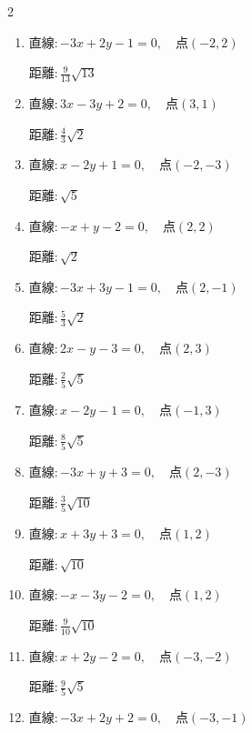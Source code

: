 \begin{multicols}{2}
\begin{enumerate}
        $\displaystyle 距離 : \frac{5}{13}\sqrt{13}$

  \item $直線:-3x+2y-1=0,\quad 点 ( -2, 2 )$

        $\displaystyle 距離 : \frac{9}{13}\sqrt{13}$

  \item $直線:3x-3y+2=0,\quad 点 ( 3, 1 )$

        $\displaystyle 距離 : \frac{4}{3}\sqrt{2}$

  \item $直線:x-2y+1=0,\quad 点 ( -2, -3 )$

        $\displaystyle 距離 : \sqrt{5}$

  \item $直線:-x+y-2=0,\quad 点 ( 2, 2 )$

        $\displaystyle 距離 : \sqrt{2}$

  \item $直線:-3x+3y-1=0,\quad 点 ( 2, -1 )$

        $\displaystyle 距離 : \frac{5}{3}\sqrt{2}$

  \item $直線:2x-y-3=0,\quad 点 ( 2, 3 )$

        $\displaystyle 距離 : \frac{2}{5}\sqrt{5}$

  \item $直線:x-2y-1=0,\quad 点 ( -1, 3 )$

        $\displaystyle 距離 : \frac{8}{5}\sqrt{5}$

\columnbreak %

  \item $直線:-3x+y+3=0,\quad 点 ( 2, -3 )$

        $\displaystyle 距離 : \frac{3}{5}\sqrt{10}$

  \item $直線:x+3y+3=0,\quad 点 ( 1, 2 )$

        $\displaystyle 距離 : \sqrt{10}$

  \item $直線:-x-3y-2=0,\quad 点 ( 1, 2 )$

        $\displaystyle 距離 : \frac{9}{10}\sqrt{10}$

  \item $直線:x+2y-2=0,\quad 点 ( -3, -2 )$

        $\displaystyle 距離 : \frac{9}{5}\sqrt{5}$

  \item $直線:-3x+2y+2=0,\quad 点 ( -3, -1 )$


\end{enumerate}
\end{multicols}
